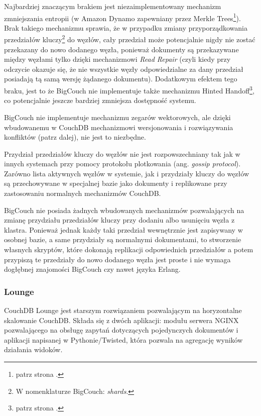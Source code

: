 Najbardziej znaczącym brakiem jest niezaimplementowany mechanizm zmniejszania entropii (w Amazon Dynamo zapewniany przez Merkle Trees\footnote{patrz strona \pageref{merkle-trees}.}).
Brak takiego mechanizmu sprawia, że w przypadku zmiany przyporządkowania przedziałów kluczy\footnote{W nomenklaturze BigCouch: \emph{shards}.} do węzłów, cały przedział może potencjalnie nigdy nie zostać przekazany do nowo dodanego węzła, ponieważ dokumenty są przekazywane między węzłami tylko dzięki mechanizmowi \emph{Read Repair} (czyli kiedy przy odczycie okazuje się, że nie wszystkie węzły odpowiedzialne za dany przedział posiadają tą samą wersję żądanego dokumentu).
Dodatkowym efektem tego braku, jest to że BigCouch nie implementuje także mechanizmu Hinted Handoff\footnote{patrz strona \pageref{sec:dynamo-hinted-handoff}.}, co potencjalnie jeszcze bardziej zmniejsza dostępność systemu.

BigCouch nie implementuje mechanizmu zegarów wektorowych, ale dzięki wbudowanemu w CouchDB mechanizmowi wersjonowania i rozwiązywania konfliktów (patrz dalej), nie jest to niezbędne.

Przydział przedziałów kluczy do węzłów nie jest rozpowszechniany tak jak w innych systemach przy pomocy protokołu plotkowania (ang. \emph{gossip protocol}).
Zarówno lista aktywnych węzłów w systemie, jak i przydziały kluczy do węzłów są przechowywane w specjalnej bazie jako dokumenty i replikowane przy zastosowaniu normalnych mechanizmów CouchDB. 

BigCouch nie posiada żadnych wbudowanych mechanizmów pozwalających na zmianę przydziału przedziałów kluczy przy dodaniu albo usunięciu węzła z klastra.
Ponieważ jednak każdy taki przedział wewnętrznie jest zapisywany w osobnej bazie, a same przydziały są normalnymi dokumentami, to stworzenie własnych skryptów, które dokonają replikacji odpowiednich przedziałów a potem przypiszą te przedziały do nowo dodanego węzła jest proste i nie wymaga dogłębnej znajomości BigCouch czy nawet języka Erlang.

\subsubsection*{Lounge}

CouchDB Lounge jest starszym rozwiązaniem pozwalającym na horyzontalne skalowanie CouchDB.
Składa się z dwóch aplikacji: modułu serwera NGINX pozwalającego na obsługę zapytań dotyczących pojedynczych dokumentów i aplikacji napisanej w Pythonie/Twisted, która pozwala na agregację wyników działania widoków.


